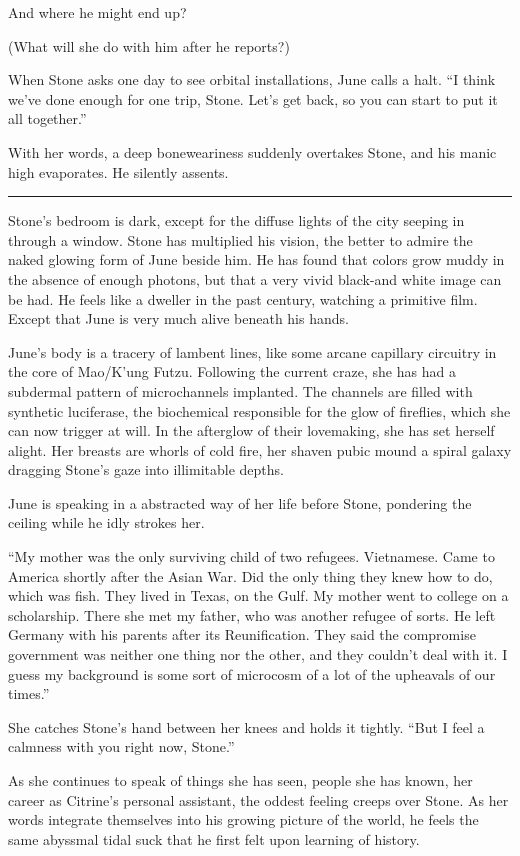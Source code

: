 And where he might end up?

(What will she do with him after he reports?)

When Stone asks one day to see orbital installations, June calls a halt. ``I think we've done enough for one trip, Stone. Let's get back, so you can start to put it all together.''

With her words, a deep boneweariness suddenly overtakes Stone, and his manic high evaporates. He silently assents.

\fancybreak{* * *}

Stone's bedroom is dark, except for the diffuse lights of the city seeping in through a window. Stone has multiplied his vision, the better to admire the naked glowing form of June beside him. He has found that colors grow muddy in the absence of enough photons, but that a very vivid black-and white image can be had. He feels like a dweller in the past century, watching a primitive film. Except that June is very much alive beneath his hands.

June's body is a tracery of lambent lines, like some arcane capillary circuitry in the core of Mao/K'ung Futzu. Following the current craze, she has had a subdermal pattern of microchannels implanted. The channels are filled with synthetic luciferase, the biochemical responsible for the glow of fireflies, which she can now trigger at will. In the afterglow of their lovemaking, she has set herself alight. Her breasts are whorls of cold fire, her shaven pubic mound a spiral galaxy dragging Stone's gaze into illimitable depths.

June is speaking in a abstracted way of her life before Stone, pondering the ceiling while he idly strokes her.

``My mother was the only surviving child of two refugees. Vietnamese. Came to America shortly after the Asian War. Did the only thing they knew how to do, which was fish. They lived in Texas, on the Gulf. My mother went to college on a scholarship. There she met my father, who was another refugee of sorts. He left Germany with his parents after its Reunification. They said the compromise government was neither one thing nor the other, and they couldn't deal with it. I guess my background is some sort of microcosm of a lot of the upheavals of our times.''

She catches Stone's hand between her knees and holds it tightly. ``But I feel a calmness with you right now, Stone.''

As she continues to speak of things she has seen, people she has known, her career as Citrine's personal assistant, the oddest feeling creeps over Stone. As her words integrate themselves into his growing picture of the world, he feels the same abyssmal tidal suck that he first felt upon learning of history.

